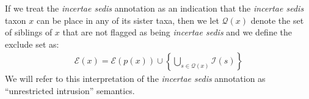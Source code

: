 \documentclass[english]{article}
\begin{document}
If we treat the  \emph{incertae sedis} annotation as an indication that the 
    \emph{incertae sedis} taxon $x$ can be place in any of its sister taxa, then
    we let $\mathcal{Q}(x)$ denote the set of siblings of $x$ that are not
    flagged as being \emph{incertae sedis} and we define the exclude set as:
\begin{align}
    \mathcal{E}(x) = \mathcal{E}(p(x)) \cup \left\{ \bigcup_{s\in \mathcal{Q}(x)} \mathcal{I}(s)\right\}
    \label{eq:exsetformonea}
\end{align}
We will refer to this interpretation of the \emph{incertae sedis} annotation as ``unrestricted
    intrusion'' semantics.




\end{document}
